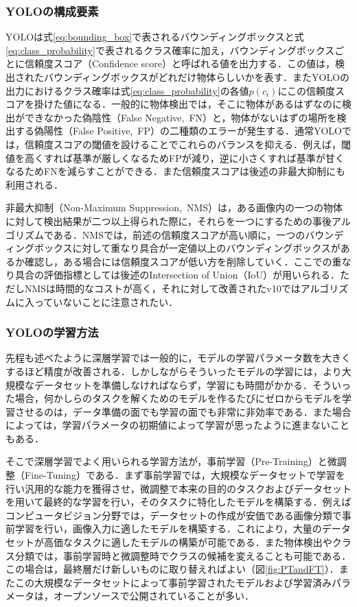         \subsubsection{YOLOの構成要素}
        \label{subsubsec:yolo_components}

        YOLOは式\ref{eq:bounding_box}で表されるバウンディングボックスと式\ref{eq:class_probability}で表されるクラス確率に加え，バウンディングボックスごとに信頼度スコア（Confidence score）と呼ばれる値を出力する．この値は，検出されたバウンディングボックスがどれだけ物体らしいかを表す．またYOLOの出力におけるクラス確率は式\ref{eq:class_probability}の各値$p(c_i)$にこの信頼度スコアを掛けた値になる．一般的に物体検出では，そこに物体があるはずなのに検出ができなかった偽陰性（False Negative,\ FN）と，物体がないはずの場所を検出する偽陽性（False Positive,\ FP）の二種類のエラーが発生する．通常YOLOでは，信頼度スコアの閾値を設けることでこれらのバランスを抑える．例えば，閾値を高くすれば基準が厳しくなるためFPが減り，逆に小さくすれば基準が甘くなるためFNを減らすことができる．また信頼度スコアは後述の非最大抑制にも利用される．

        非最大抑制（Non-Maximum Suppression,\ NMS）は，ある画像内の一つの物体に対して検出結果が二つ以上得られた際に，それらを一つにするための事後アルゴリズムである．NMSでは，前述の信頼度スコアが高い順に，一つのバウンディングボックスに対して重なり具合が一定値以上のバウンディングボックスがあるか確認し，ある場合には信頼度スコアが低い方を削除していく．ここでの重なり具合の評価指標としては後述のIntersection of Union（IoU）が用いられる．ただしNMSは時間的なコストが高く，それに対して改善されたv10ではアルゴリズムに入っていないことに注意されたい．

        \subsubsection{YOLOの学習方法}

        先程も述べたように深層学習では一般的に，モデルの学習パラメータ数を大きくするほど精度が改善される．しかしながらそういったモデルの学習には，より大規模なデータセットを準備しなければならず，学習にも時間がかかる．そういった場合，何かしらのタスクを解くためのモデルを作るたびにゼロからモデルを学習させるのは，データ準備の面でも学習の面でも非常に非効率である．また場合によっては，学習パラメータの初期値によって学習が思ったように進まないこともある．

        そこで深層学習でよく用いられる学習方法が，事前学習（Pre-Training）と微調整（Fine-Tuning）である\cite{radford2018improving}．まず事前学習では，大規模なデータセットで学習を行い汎用的な能力を獲得させ，微調整で本来の目的のタスクおよびデータセットを用いて最終的な学習を行い，そのタスクに特化したモデルを構築する．例えばコンピュータビジョン分野では，データセットの作成が安価である画像分類で事前学習を行い，画像入力に適したモデルを構築する．これにより，大量のデータセットが高価なタスクに適したモデルの構築が可能である．また物体検出やクラス分類では，事前学習時と微調整時でクラスの候補を変えることも可能である．この場合は，最終層だけ新しいものに取り替えればよい（図\ref{fig:PTandFT}）．またこの大規模なデータセットによって事前学習されたモデルおよび学習済みパラメータは，オープンソースで公開されていることが多い．

